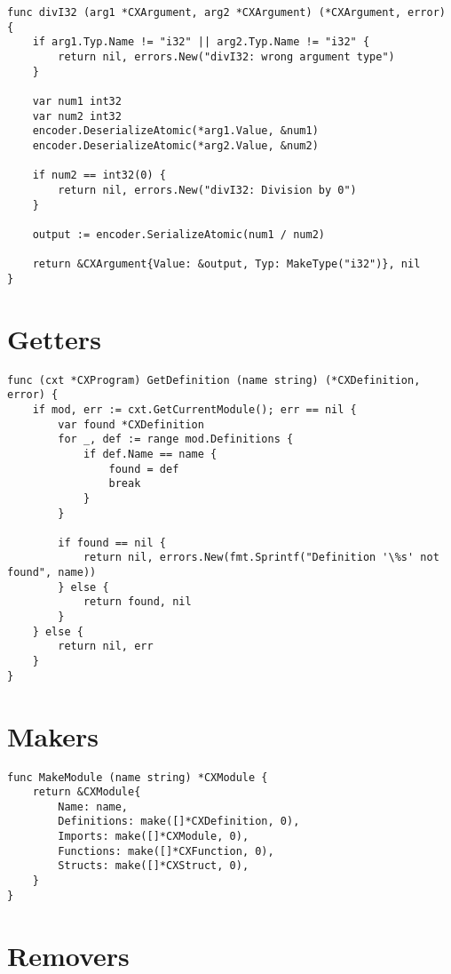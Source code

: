 \begin{lstlisting}[float=*, caption=Example of a Native Function]
func divI32 (arg1 *CXArgument, arg2 *CXArgument) (*CXArgument, error) {
	if arg1.Typ.Name != "i32" || arg2.Typ.Name != "i32" {
		return nil, errors.New("divI32: wrong argument type")
	}
	
	var num1 int32
	var num2 int32
	encoder.DeserializeAtomic(*arg1.Value, &num1)
	encoder.DeserializeAtomic(*arg2.Value, &num2)

	if num2 == int32(0) {
		return nil, errors.New("divI32: Division by 0")
	}

	output := encoder.SerializeAtomic(num1 / num2)

	return &CXArgument{Value: &output, Typ: MakeType("i32")}, nil
}
\end{lstlisting}

\section{Getters}
\label{implementation-getters}

\begin{lstlisting}[float=*, caption=Example of a Getter]
func (cxt *CXProgram) GetDefinition (name string) (*CXDefinition, error) {
	if mod, err := cxt.GetCurrentModule(); err == nil {
		var found *CXDefinition
		for _, def := range mod.Definitions {
			if def.Name == name {
				found = def
				break
			}
		}
		
		if found == nil {
			return nil, errors.New(fmt.Sprintf("Definition '\%s' not found", name))
		} else {
			return found, nil
		}
	} else {
		return nil, err
	}
}
\end{lstlisting}

\section{Makers}
\label{implementation-makers}

\begin{lstlisting}[float=*, caption=Example of a Maker]
func MakeModule (name string) *CXModule {
	return &CXModule{
		Name: name,
		Definitions: make([]*CXDefinition, 0),
		Imports: make([]*CXModule, 0),
		Functions: make([]*CXFunction, 0),
		Structs: make([]*CXStruct, 0),
	}
}
\end{lstlisting}

\section{Removers}
\label{implementation-removers}

